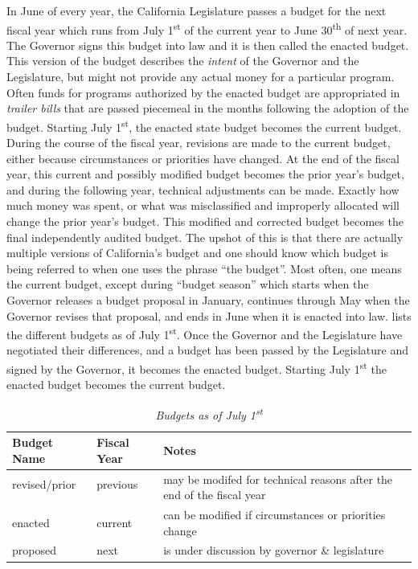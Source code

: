 In June of every year, the California Legislature passes a budget for the next fiscal year which runs from July 1\textsuperscript{st} of the current year to June 30\textsuperscript{th} of next year. The Governor signs this budget into law and it is then called the enacted budget. This version of the budget describes the \textit{intent} of the Governor and the Legislature, but might not provide any actual money for a particular program. Often funds for programs authorized by the enacted budget are appropriated in \textit{trailer bills} that are passed piecemeal in the months following the adoption of the budget. Starting July 1\textsuperscript{st}, the enacted state budget becomes the current budget. During the course of the fiscal year, revisions are made to the current budget, either because circumstances or priorities have changed. At the end of the fiscal year, this current and possibly modified budget becomes the prior year's budget, and during the following year, technical adjustments can be made. Exactly how much money was spent, or what was misclassified and improperly allocated will change the prior year's budget. This modified and corrected budget becomes the final independently audited budget. The upshot of this is that there are actually multiple versions of California's budget and one should know which budget is being referred to when one uses the phrase ``the budget''. Most often, one means the current budget, except during ``budget season'' which starts when the Governor releases a budget proposal in January, continues through May when the Governor revises that proposal, and ends in June when it is enacted into law.  lists the different budgets as of July 1\textsuperscript{st}. Once the Governor and the Legislature have negotiated their differences, and a budget has been passed by the Legislature and signed by the Governor, it becomes the enacted budget. Starting July 1\textsuperscript{st} the enacted budget becomes the current budget.

\begin{table}[ht]
  \OnehalfSpacing%
  \caption[Budgets as of July 1\textsuperscript{st}]{\textit{Budgets as of July 1\textsuperscript{st}}}%
  \label{tab:july_1_budgets}%
  \begin{tabularx}{\linewidth}{lll}
    \toprule
    \textbf{Budget Name} & \textbf{Fiscal Year} & \textbf{Notes}\\
    \midrule
      revised/prior  & previous & \multirow[t]{2}{4in}{may be modifed for technical reasons after the end of the fiscal year}\\\vspace{1ex}\\
      enacted  & current  & can be modified if circumstances or priorities change\vspace{1ex}\\
      proposed & next     & is under discussion by governor \& legislature\\
  \bottomrule
\end{tabularx}
\end{table}


